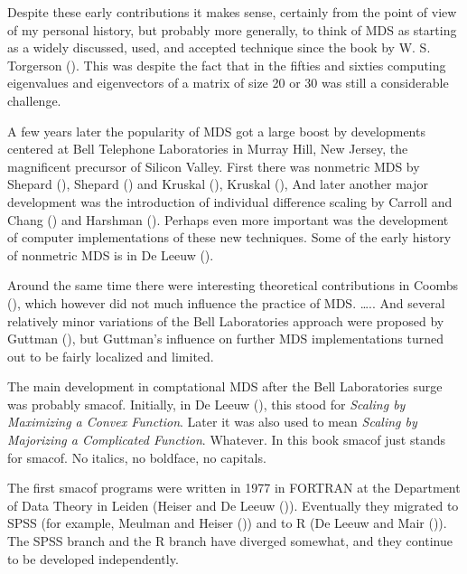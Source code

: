 \documentclass[
  12pt,
  letterpaper,
  DIV=11,
  numbers=noendperiod]{scrartcl}
\begin{document}
Despite these early contributions it makes sense, certainly from the
point of view of my personal history, but probably more generally, to
think of MDS as starting as a widely discussed, used, and accepted
technique since the book by W. S. Torgerson
(). This was despite the fact that in
the fifties and sixties computing eigenvalues and eigenvectors of a
matrix of size 20 or 30 was still a considerable challenge.

A few years later the popularity of MDS got a large boost by
developments centered at Bell Telephone Laboratories in Murray Hill, New
Jersey, the magnificent precursor of Silicon Valley. First there was
nonmetric MDS by Shepard (), Shepard
() and Kruskal
(), Kruskal
(), And later another major development
was the introduction of individual difference scaling by Carroll and
Chang () and Harshman
(). Perhaps even more important was the
development of computer implementations of these new techniques. Some of
the early history of nonmetric MDS is in De Leeuw
().

Around the same time there were interesting theoretical contributions in
Coombs (), which however did not much
influence the practice of MDS. \ldots.. And several relatively minor
variations of the Bell Laboratories approach were proposed by Guttman
(), but Guttman's influence on further
MDS implementations turned out to be fairly localized and limited.

The main development in comptational MDS after the Bell Laboratories
surge was probably smacof. Initially, in De Leeuw
(), this stood for \emph{Scaling by
Maximizing a Convex Function}. Later it was also used to mean
\emph{Scaling by Majorizing a Complicated Function}. Whatever. In this
book smacof just stands for smacof. No italics, no boldface, no
capitals.

The first smacof programs were written in 1977 in FORTRAN at the
Department of Data Theory in Leiden (Heiser and De Leeuw
()). Eventually they migrated to
SPSS (for example, Meulman and Heiser
()) and to R (De Leeuw and Mair
()). The SPSS branch and the R
branch have diverged somewhat, and they continue to be developed
independently.
\end{document}
